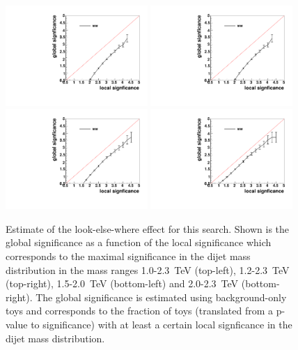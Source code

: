 \begin{figure}[htb]
\begin{center}
\includegraphics[width=0.48\textwidth,angle=0]{EXO-12-024/figs/appendix/Xvv_WW_8TeV_Sig_channel2_toys_1000_2300.pdf}
\includegraphics[width=0.48\textwidth,angle=0]{EXO-12-024/figs/appendix/Xvv_WW_8TeV_Sig_channel2_toys_1200_2300.pdf}
\includegraphics[width=0.48\textwidth,angle=0]{EXO-12-024/figs/appendix/Xvv_WW_8TeV_Sig_channel2_toys_1500_2000.pdf}
\includegraphics[width=0.48\textwidth,angle=0]{EXO-12-024/figs/appendix/Xvv_WW_8TeV_Sig_channel2_toys_2000_2300.pdf}
\end{center}
\caption{Estimate of the look-else-where effect for this search.
Shown is the global significance as a function
of the local significance which corresponds to the maximal significance in the dijet mass distribution in the
mass ranges 1.0-2.3~TeV (top-left), 1.2-2.3~TeV (top-right), 1.5-2.0~TeV (bottom-left) and 2.0-2.3~TeV (bottom-right).
The global significance is estimated using background-only toys and corresponds to the fraction of toys
(translated from a p-value to significance) with at least a certain local signficance in the dijet mass distribution.}
\label{fig:lee}
\end{figure}

